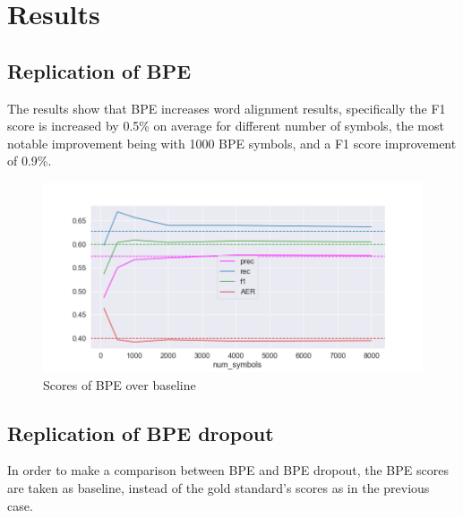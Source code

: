 %
%

\chapter{Results}\label{ch:results}

\section{Replication of BPE}

The results show that BPE increases word alignment results, specifically the F1 score is increased by 0.5\% on average for different number of symbols, the most notable improvement being with 1000 BPE symbols, and a F1 score improvement of 0.9\%.

\begin{figure}[!ht]
    \centering
    \includegraphics[width=14cm]{figures/eng_deu_fastalign.png}
    \caption{Scores of BPE over baseline}
\end{figure}

\section{Replication of BPE dropout}

In order to make a comparison between BPE and BPE dropout, the BPE scores are taken as baseline, instead of the gold standard's scores as in the previous case.

%


